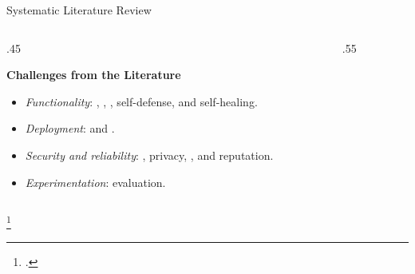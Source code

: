 \begin{frame}{Systematic Literature Review}
  
  \begin{columns}
    \begin{column}{.45\textwidth}

      \textbf{Challenges from the Literature}~\autocite{lavaur_tnsm_2022}
      \begin{itemize}[<+->]
        \item \textit{Functionality}: , , , self-defense, and self-healing.
        \item \textit{Deployment}:  and .
        \item \textit{Security and reliability}: , privacy, , and reputation.
        \item \textit{Experimentation}: evaluation.
      \end{itemize}
    \end{column}
    \begin{column}{.55\textwidth}
    \end{column}
  \end{columns}

  \footcite*{lavaur_tnsm_2022}
\end{frame}


